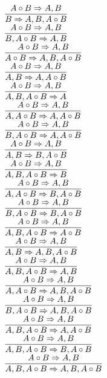 \documentclass[11pt]{article}
\begin{document}
\begin{center}
\bigskip
\\$\infer{B\Rightarrow A, B, A\circ B}{A\circ B\Rightarrow A, B}$
\bigskip
\\$\infer{B, A\circ B\Rightarrow A, B}{A\circ B\Rightarrow A, B}$
\bigskip
\\$\infer{A\circ B\Rightarrow A, B, A\circ B}{A\circ B\Rightarrow A, B}$
\bigskip
\\$\infer{A, B\Rightarrow A, A\circ B}{A\circ B\Rightarrow A, B}$
\bigskip
\\$\infer{A, B, A\circ B\Rightarrow A}{A\circ B\Rightarrow A, B}$
\bigskip
\\$\infer{A, A\circ B\Rightarrow A, A\circ B}{A\circ B\Rightarrow A, B}$
\bigskip
\\$\infer{B, A\circ B\Rightarrow A, A\circ B}{A\circ B\Rightarrow A, B}$
\bigskip
\\$\infer{A, B\Rightarrow B, A\circ B}{A\circ B\Rightarrow A, B}$
\bigskip
\\$\infer{A, B, A\circ B\Rightarrow B}{A\circ B\Rightarrow A, B}$
\bigskip
\\$\infer{A, A\circ B\Rightarrow B, A\circ B}{A\circ B\Rightarrow A, B}$
\bigskip
\\$\infer{B, A\circ B\Rightarrow B, A\circ B}{A\circ B\Rightarrow A, B}$
\bigskip
\\$\infer{A, B, A\circ B\Rightarrow A\circ B}{A\circ B\Rightarrow A, B}$
\bigskip
\\$\infer{A, B\Rightarrow A, B, A\circ B}{A\circ B\Rightarrow A, B}$
\bigskip
\\$\infer{A, B, A\circ B\Rightarrow A, B}{A\circ B\Rightarrow A, B}$
\bigskip
\\$\infer{A, A\circ B\Rightarrow A, B, A\circ B}{A\circ B\Rightarrow A, B}$
\bigskip
\\$\infer{B, A\circ B\Rightarrow A, B, A\circ B}{A\circ B\Rightarrow A, B}$
\bigskip
\\$\infer{A, B, A\circ B\Rightarrow A, A\circ B}{A\circ B\Rightarrow A, B}$
\bigskip
\\$\infer{A, B, A\circ B\Rightarrow B, A\circ B}{A\circ B\Rightarrow A, B}$
\bigskip
\\$\infer{A, B, A\circ B\Rightarrow A, B, A\circ B}{A\circ B\Rightarrow A, B}$
\bigskip
\\
\end{center}
\end{document}
